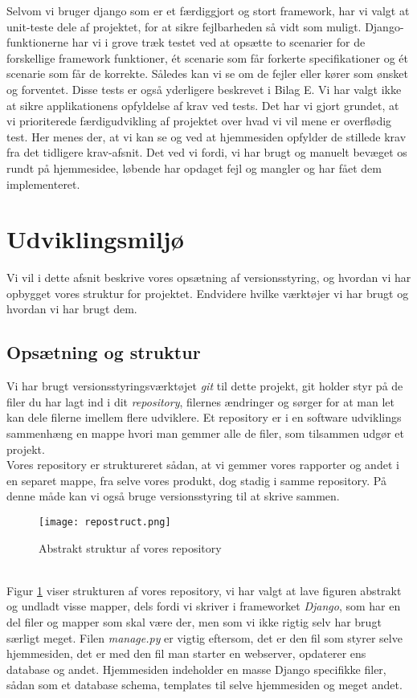 \documentclass[12pt]{article}
\begin{document}
Selvom vi bruger django som er et færdiggjort og stort framework, har vi valgt at unit-teste dele af projektet, for at sikre fejlbarheden så vidt som muligt. Django-funktionerne har vi i grove træk testet ved at opsætte to scenarier for de forskellige framework funktioner, ét scenarie som får forkerte specifikationer og ét scenarie som får de korrekte. Således kan vi se om de fejler eller kører som ønsket og forventet. Disse tests er også yderligere beskrevet i Bilag E.
Vi har valgt ikke at sikre applikationens opfyldelse af krav ved tests. Det har vi gjort grundet, at vi prioriterede færdigudvikling af projektet over hvad vi vil mene er overflødig test. Her menes der, at vi kan se og ved at hjemmesiden opfylder de stillede krav fra det tidligere krav-afsnit. Det ved vi fordi, vi har brugt og manuelt bevæget os rundt på hjemmesidee, løbende har opdaget fejl og mangler og har fået dem implementeret.

\section{Udviklingsmiljø}
\label{sec:udvikling}
Vi vil i dette afsnit beskrive vores opsætning af versionsstyring, og hvordan vi har opbygget vores struktur for projektet. Endvidere hvilke værktøjer vi har brugt og hvordan vi har brugt dem.

\subsection{Opsætning og struktur}
Vi har brugt versionsstyringsværktøjet \textit{git} til dette projekt, git holder styr på de filer du har lagt ind i dit \textit{repository}, filernes ændringer og sørger for at man let kan dele filerne imellem flere udviklere. Et repository er i en software udviklings sammenhæng en mappe hvori man gemmer alle de filer, som tilsammen udgør et projekt. \\
Vores repository er struktureret sådan, at vi gemmer vores rapporter og andet i en separet mappe, fra selve vores produkt, dog stadig i samme repository. På denne måde kan vi også bruge versionsstyring til at skrive sammen.

\begin{figure}[H]
	\centering
	\texttt{[image: repostruct.png]}
	 \caption{Abstrakt struktur af vores repository}
	 \label{fig:repostruct}
\end{figure}
~\\
Figur \ref{fig:repostruct} viser strukturen af vores repository, vi har valgt at lave figuren abstrakt og undladt visse mapper, dels fordi vi skriver i frameworket \textit{Django}, som har en del filer og mapper som skal være der, men som vi ikke rigtig selv har brugt særligt meget. Filen \textit{manage.py} er vigtig eftersom, det er den fil som styrer selve hjemmesiden, det er med den fil man starter en webserver, opdaterer ens database og andet. Hjemmesiden indeholder en masse Django specifikke filer, sådan som et database schema, templates til selve hjemmesiden og meget andet.
\end{document}
